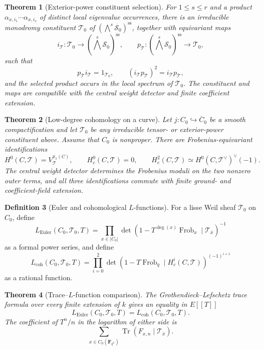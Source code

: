 \documentclass[10pt]{article}
\newtheorem{theorem}{Theorem}[section]
\theoremstyle{definition}
\newtheorem{definition}[theorem]{Definition}
\newcommand{\Frob}{\operatorname{Frob}}
\begin{document}
\begin{theorem}[Exterior-power constituent selection]
For \(1\le s\le r\) and a product
\(\alpha_{x,i_1}\cdots\alpha_{x,i_s}\) of distinct local eigenvalue
occurrences, there is an irreducible monodromy constituent
\(\mathcal T_0\) of \((\bigwedge^s\mathcal S_0)^{\mathrm{ss}}\), together with
equivariant maps
\[
 i_{\mathcal T}:\mathcal T_0\longrightarrow
       (\bigwedge^s\mathcal S_0)^{\mathrm{ss}},
 \qquad
 p_{\mathcal T}:(\bigwedge^s\mathcal S_0)^{\mathrm{ss}}
       \longrightarrow\mathcal T_0,
\]
such that
\[
 p_{\mathcal T}i_{\mathcal T}=1_{\mathcal T_0},\qquad
 (i_{\mathcal T}p_{\mathcal T})^2=i_{\mathcal T}p_{\mathcal T},
\]
and the selected product occurs in the local spectrum of \(\mathcal T_0\).
The constituent and maps are compatible with the central weight detector
and finite coefficient extension.
\end{theorem}

\begin{theorem}[Low-degree cohomology on a curve]
Let \(j:C_0\hookrightarrow\overline C_0\) be a smooth compactification and
let \(\mathcal T_0\) be any irreducible tensor- or exterior-power
constituent above.  Assume that \(C_0\) is nonproper.  There are
Frobenius-equivariant identifications
\[
 H^0(C,\mathcal T)=V_{\mathcal T}^{\pi_1(C)},\qquad
 H_c^0(C,\mathcal T)=0,\qquad
 H_c^2(C,\mathcal T)\simeq
 H^0(C,\mathcal T^\vee)^\vee(-1).
\]
The central weight detector determines the Frobenius moduli on the two
nonzero outer terms, and all three identifications commute with finite
ground- and coefficient-field extension.
\end{theorem}

\begin{definition}[Euler and cohomological \(L\)-functions]
For a lisse Weil sheaf \(\mathcal T_0\) on \(C_0\), define
\[
 L_{\mathrm{Euler}}(C_0,\mathcal T_0,T)=
 \prod_{x\in|C_0|}
 \det(1-T^{\deg(x)}\Frob_x\mid\mathcal T_{\bar x})^{-1}
\]
as a formal power series, and define
\[
 L_{\mathrm{coh}}(C_0,\mathcal T_0,T)=
 \prod_{i=0}^2
 \det(1-T\Frob_q\mid H_c^i(C,\mathcal T))^{(-1)^{i+1}}
\]
as a rational function.
\end{definition}

\begin{theorem}[Trace--\(L\)-function comparison]
The Grothendieck--Lefschetz trace formula over every finite extension of
\(k\) gives an equality in \(E[[T]]\)
\[
 L_{\mathrm{Euler}}(C_0,\mathcal T_0,T)
       =L_{\mathrm{coh}}(C_0,\mathcal T_0,T).
\]
The coefficient of \(T^n/n\) in the logarithm of either side is
\[
 \sum_{x\in C_0(\mathbf F_{q^n})}
       \operatorname{Tr}(F_{x,n}\mid\mathcal T_{\bar x}).
\]
\end{theorem}
\end{document}
